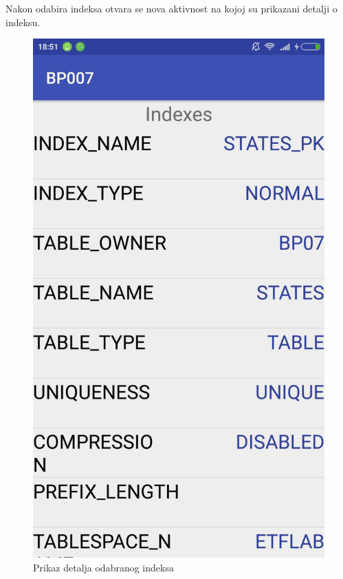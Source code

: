 \documentclass[12pt, a4paper]{report}
\theoremstyle{definition}
\begin{document}
Nakon odabira indeksa otvara se nova aktivnost na kojoj su prikazani detalji o indeksu.
\begin{figure}[H]
	\begin{center} 
		\includegraphics[height=0.5\textwidth]{m.jpg}
	\end{center}
	\caption{Prikaz detalja odabranog indeksa}
\end{figure}
\end{document}
